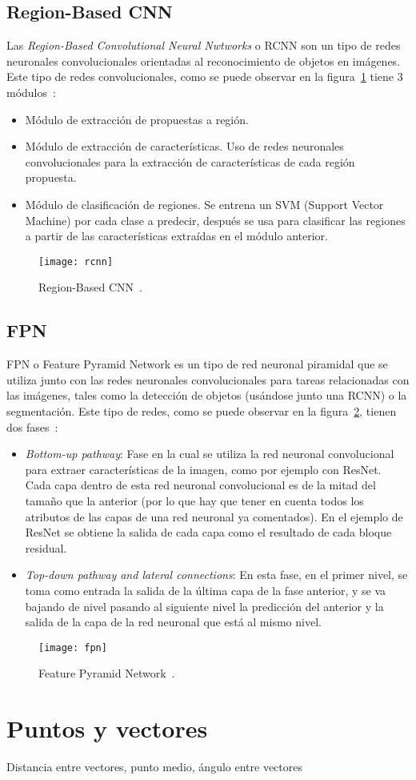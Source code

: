 \subsection{Region-Based CNN}
Las \textit{Region-Based Convolutional Neural Nwtworks} o RCNN son un tipo de redes neuronales convolucionales orientadas al reconocimiento de objetos en imágenes. Este tipo de redes convolucionales, como se puede observar en la figura~\ref{fig:rcnn} tiene 3 módulos~\cite{cnn}:
\begin{itemize}
	\item Módulo de extracción de propuestas a región.
	\item Módulo de extracción de características. Uso de redes neuronales convolucionales para la extracción de características de cada región propuesta.
	\item Módulo de clasificación de regiones. Se entrena un SVM (Support Vector Machine) por cada clase a predecir, después se usa para clasificar las regiones a partir de las características extraídas en el módulo anterior.
\end{itemize}
\begin{figure}[h]
	\centering
	\texttt{[image: rcnn]}
	\caption{Region-Based CNN~\cite{cnn}.}
	\label{fig:rcnn}
\end{figure}
\subsection{FPN}
FPN o Feature Pyramid Network es un tipo de red neuronal piramidal que se utiliza junto con las redes neuronales convolucionales para tareas relacionadas con las imágenes, tales como la detección de objetos (usándose junto una RCNN) o la segmentación. Este tipo de redes, como se puede observar en la figura~\ref{fig:fpn}, tienen dos fases~\cite{fpn}:
\begin{itemize}
	\item \textit{Bottom-up pathway}: Fase en la cual se utiliza la red neuronal convolucional para extraer características de la imagen, como por ejemplo con ResNet. Cada capa dentro de esta red neuronal convolucional es de la mitad del tamaño que la anterior (por lo que hay que tener en cuenta todos los atributos de las capas de una red neuronal ya comentados). En el ejemplo de ResNet se obtiene la salida de cada capa como el resultado de cada bloque residual.
	\item \textit{Top-down pathway and lateral connections}: En esta fase, en el primer nivel, se toma como entrada la salida de la última capa de la fase anterior, y se va bajando de nivel pasando al siguiente nivel la predicción del anterior y la salida de la capa de la red neuronal que está al mismo nivel.
\end{itemize}
\begin{figure}[h]
	\centering
	\texttt{[image: fpn]}
	\caption{Feature Pyramid Network~\cite{fpn}.}
	\label{fig:fpn}
\end{figure}

\section{Puntos y vectores}
Distancia entre vectores, punto medio, ángulo entre vectores
